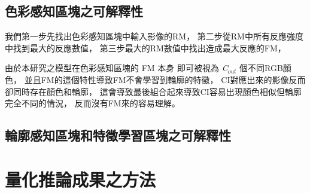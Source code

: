 \documentclass[class=NCU_thesis, crop=false]{standalone}
\begin{document}
	\subsection{色彩感知區塊之可解釋性}
	我們第一步先找出色彩感知區塊中輸入影像的RM，
	第二步從RM中所有反應強度中找到最大的反應數值，
	第三步最大的RM數值中找出造成最大反應的FM，

	由於本研究之模型在色彩感知區塊的 FM 本身
	即可被視為 \textit{C}$_{out}$ 個不同RGB顏色，
	並且FM的這個特性導致FM不會學習到輪廓的特徵，
	CI對應出來的影像反而卻同時存在顏色和輪廓，
	這會導致最後組合起來導致CI容易出現顏色相似但輪廓完全不同的情況，
	反而沒有FM來的容易理解。

	\subsection{輪廓感知區塊和特徵學習區塊之可解釋性}
	
	

\section{量化推論成果之方法}
\end{document}
